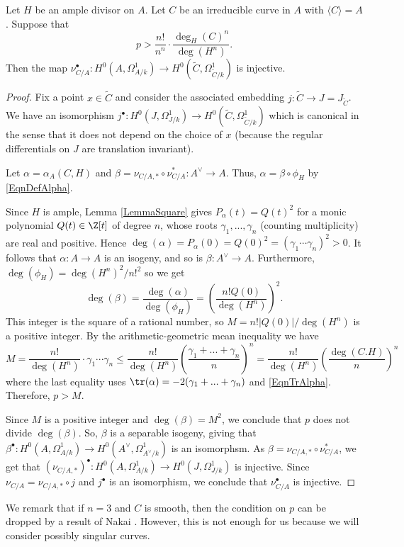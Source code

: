 \begin{lemma}
\notready\label{LemmaInjCurves} Let $H$ be an ample divisor on $A$. Let $C$ be an irreducible curve in $A$ with $\langle C\rangle =A$. Suppose that
$$
p>\frac{n!}{n^n}\cdot \frac{\deg_H(C)^n}{\deg(H^n)}.
$$
Then the map $\nu_{C/A}^\bullet : H^0(A,\Omega^1_{A/k})\to H^0(\widetilde{C}, \Omega^1_{\widetilde{C}/k})$ is injective.
\end{lemma}
\begin{proof} Fix a point $x\in \widetilde{C}$ and consider the associated embedding $j: \widetilde{C}\to J=J_{\widetilde{C}}$. We have an isomorphism $j^\bullet : H^0(J,\Omega^1_{J/k})\to H^0(\widetilde{C}, \Omega^1_{\widetilde{C}/k})$ which is canonical in the sense that it does not depend on the choice of $x$ (because the regular differentials on $J$ are translation invariant).

Let $\alpha =\alpha_A(C,H)$ and $\beta = \nu_{C/A,*}\circ \nu_{C/A}^* : A^\vee \to A$. Thus, $\alpha=\beta\circ \phi_H$ by \eqref{EqnDefAlpha}.

Since $H$ is ample, Lemma \ref{LemmaSquare} gives $P_\alpha(t)=Q(t)^2$ for a monic polynomial $Q(t)\in \Z[t]$ of degree $n$, whose roots $\gamma_1,...,\gamma_n$ (counting multiplicity) are real and positive. Hence $\deg(\alpha)=P_\alpha(0)=Q(0)^2=(\gamma_1\cdots \gamma_n)^2 >0$. It follows that $\alpha:A\to A$ is an isogeny, and so is $\beta: A^\vee\to A$. Furthermore, $\deg(\phi_H)=\deg(H^n)^2/n!^2$ so we get
$$
\deg(\beta)=\frac{\deg(\alpha)}{\deg(\phi_H)}=\left(\frac{n! Q(0)}{\deg(H^n)}\right)^2.
$$
This integer is the square of a rational number, so $M=n! |Q(0)|/\deg(H^n)$ is a positive integer. By the arithmetic-geometric mean inequality we have
$$
M = \frac{n!}{\deg(H^n)}\cdot \gamma_1\cdots \gamma_n\le \frac{n!}{\deg(H^n)}\left(\frac{\gamma_1+...+ \gamma_n}{n}\right)^n = \frac{n!}{\deg(H^n)}\left(\frac{\deg(C.H)}{n}\right)^n
$$
where the last equality uses $\tr(\alpha)=-2(\gamma_1+... + \gamma_n)$ and \eqref{EqnTrAlpha}. Therefore, $p>M$.

Since $M$ is a positive integer and $\deg(\beta)=M^2$, we conclude that $p$ does not divide $\deg(\beta)$. So, $\beta$ is a separable isogeny, giving that $\beta^\bullet : H^0(A,\Omega^1_{A/k})\to H^0(A^\vee,\Omega^1_{A^\vee/k})$ is an isomorphsm. As $\beta = \nu_{C/A,*}\circ \nu_{C/A}^*$, we get that $(\nu_{C/A,*})^\bullet : H^0(A,\Omega^1_{A/k})\to H^0(J,\Omega^1_{J/k})$ is injective. Since $\nu_{C/A} = \nu_{C/A,*}\circ j$ and $j^\bullet$ is an isomorphism, we conclude that $\nu_{C/A}^\bullet$ is injective.
\end{proof}
We remark that if $n=3$ and $C$ is smooth, then the condition on $p$ can be dropped by a result of Nakai \cite{NakaiNotes}. However, this is not enough for us because we will consider possibly singular curves.




